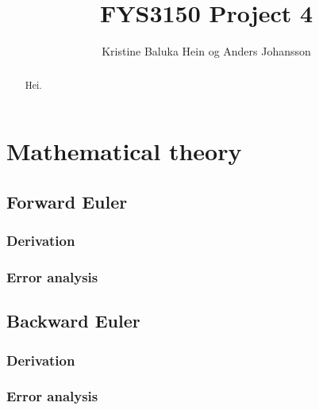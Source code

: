 \documentclass[12pt,english,a4paper]{article}
\title{FYS3150 Project 4}
\author{Kristine Baluka Hein og Anders Johansson}
\begin{document}
%
\maketitle
\pagestyle{fancy}
\tableofcontents

\begin{abstract}
Hei.
\end{abstract}
\clearpage

\section{Mathematical theory}


%
\subsection{Forward Euler}

\subsubsection{Derivation}

\subsubsection{Error analysis}



%
\subsection{Backward Euler}

\subsubsection{Derivation}

\subsubsection{Error analysis}
\end{document}
